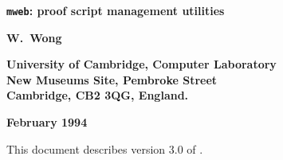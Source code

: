 
\begin{titlepage}

\setcounter{page}{1}                      %


\mbox{}
\vskip20mm
\begin{center}
{\Huge\bf {\tt mweb}: proof script management utilities}
\end{center}


\vskip15mm
\begin{center}
\large\bf W.\ Wong
\end{center}


\vfill
\begin{center}
\bf
University of Cambridge, Computer Laboratory\\
New Museums Site, Pembroke Street\\
Cambridge, {\small\bf CB}2 3{\small\bf QG}, England.
\end{center}


\vskip5mm
\begin{center}
\bf February 1994
\end{center}

\end{titlepage}

\thispagestyle{empty}
\vspace*{2cm}
\begin{center}
This document describes version 3.0 of \mweb.
\end{center}

